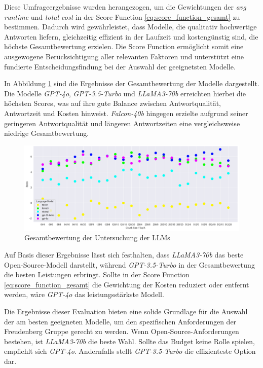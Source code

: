 Diese Umfrageergebnisse wurden herangezogen, um die Gewichtungen der \textit{avg runtime} und \textit{total cost} in der Score Function \ref{eq:score_function_gesamt} zu bestimmen. 
Dadurch wird gewährleistet, dass Modelle, die qualitativ hochwertige Antworten liefern, gleichzeitig effizient in der Laufzeit und kostengünstig sind, 
die höchste Gesamtbewertung erzielen. Die Score Function ermöglicht somit eine ausgewogene Berücksichtigung aller relevanten Faktoren und unterstützt eine fundierte Entscheidungsfindung bei der Auswahl der geeignetsten Modelle.

In Abbildung \ref{fig:gesamtwert} sind die Ergebnisse der Gesamtbewertung der Modelle dargestellt. 
Die Modelle \textit{GPT-4o}, \textit{GPT-3.5-Turbo} und \textit{LLaMA3-70b} erreichten hierbei die höchsten Scores, was auf ihre gute Balance zwischen Antwortqualität, Antwortzeit und Kosten hinweist. 
\textit{Falcon-40b} hingegen erzielte aufgrund seiner geringeren Antwortqualität und längeren Antwortzeiten eine vergleichsweise niedrige Gesamtbewertung.

\begin{figure}[H]
    \centering
    \includegraphics[width=1\textwidth]{img/gesamtScore.png}
    \caption{Gesamtbewertung der Untersuchung der \acp{LLM}}
    \label{fig:gesamtwert}
\end{figure}

Auf Basis dieser Ergebnisse lässt sich festhalten, dass \textit{LLaMA3-70b} das beste Open-Source-Modell darstellt, während \textit{GPT-3.5-Turbo} in der Gesamtbewertung die besten Leistungen erbringt. 
Sollte in der Score Function \ref{eq:score_function_gesamt} die Gewichtung der Kosten reduziert oder entfernt werden, wäre \textit{GPT-4o} das leistungsstärkste Modell.

Die Ergebnisse dieser Evaluation bieten eine solide Grundlage für die Auswahl der am besten geeigneten Modelle, um den spezifischen Anforderungen der Freudenberg Gruppe gerecht zu werden. 
Wenn Open-Source-Anforderungen bestehen, ist \textit{LLaMA3-70b} die beste Wahl. Sollte das Budget keine Rolle spielen, empfiehlt sich \textit{GPT-4o}. 
Andernfalls stellt \textit{GPT-3.5-Turbo} die effizienteste Option dar.


